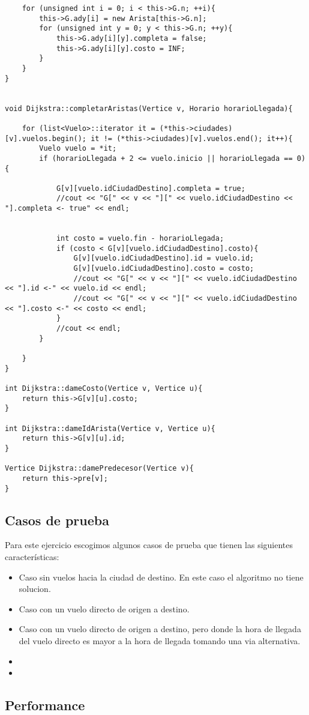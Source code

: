\begin{lstlisting}
	for (unsigned int i = 0; i < this->G.n; ++i){
		this->G.ady[i] = new Arista[this->G.n];
		for (unsigned int y = 0; y < this->G.n; ++y){
			this->G.ady[i][y].completa = false;
			this->G.ady[i][y].costo = INF;
		}
	}
}


void Dijkstra::completarAristas(Vertice v, Horario horarioLlegada){

	for (list<Vuelo>::iterator it = (*this->ciudades)[v].vuelos.begin(); it != (*this->ciudades)[v].vuelos.end(); it++){
		Vuelo vuelo = *it;
		if (horarioLlegada + 2 <= vuelo.inicio || horarioLlegada == 0){

			G[v][vuelo.idCiudadDestino].completa = true;
			//cout << "G[" << v << "][" << vuelo.idCiudadDestino << "].completa <- true" << endl;


			int costo = vuelo.fin - horarioLlegada;
			if (costo < G[v][vuelo.idCiudadDestino].costo){
				G[v][vuelo.idCiudadDestino].id = vuelo.id;
				G[v][vuelo.idCiudadDestino].costo = costo;
				//cout << "G[" << v << "][" << vuelo.idCiudadDestino << "].id <-" << vuelo.id << endl;
				//cout << "G[" << v << "][" << vuelo.idCiudadDestino << "].costo <-" << costo << endl;
			}
			//cout << endl;
		}

	}
}

int Dijkstra::dameCosto(Vertice v, Vertice u){
	return this->G[v][u].costo;
}

int Dijkstra::dameIdArista(Vertice v, Vertice u){
	return this->G[v][u].id;
}

Vertice Dijkstra::damePredecesor(Vertice v){
	return this->pre[v];
}

\end{lstlisting}
\bigskip


\subsection{Casos de prueba}

Para este ejercicio escogimos algunos casos de prueba que tienen las siguientes características:

\begin{itemize}

\item Caso sin vuelos hacia la ciudad de destino. En este caso el algoritmo no tiene solucion.
\item Caso con un vuelo directo de origen a destino.
\item Caso con un vuelo directo de origen a destino, pero donde la hora de llegada del vuelo directo es mayor a la hora de llegada tomando una via alternativa.
\item 
\item 

\end{itemize}


\subsection{Performance}




